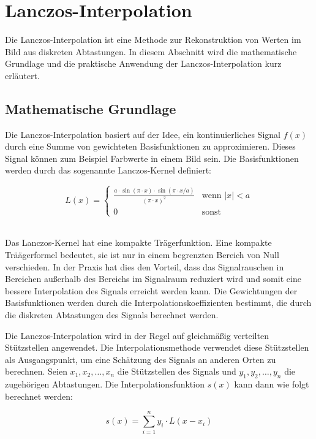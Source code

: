 \section{Lanczos-Interpolation}
    Die Lanczos-Interpolation ist eine Methode zur Rekonstruktion von Werten im Bild aus diskreten Abtastungen. 
    In diesem Abschnitt wird die mathematische Grundlage und die praktische Anwendung der Lanczos-Interpolation kurz erläutert.

\subsection{Mathematische Grundlage}

    Die Lanczos-Interpolation basiert auf der Idee, ein kontinuierliches Signal $f(x)$ durch eine Summe von gewichteten Basisfunktionen zu approximieren. 
    Dieses Signal können zum Beispiel Farbwerte in einem Bild sein.
    Die Basisfunktionen werden durch das sogenannte Lanczos-Kernel definiert:

\begin{equation}
    L(x) = \begin{cases} \frac{a \cdot \sin(\pi \cdot x) \cdot \sin(\pi \cdot x / a)}{(\pi \cdot x)^2} & \text{wenn } \left| x \right| < a \\ 0 & \text{sonst} \end{cases}
\end{equation}
~

Das Lanczos-Kernel hat eine kompakte Trägerfunktion.
Eine kompakte Träägerformel bedeutet, sie ist nur in einem begrenzten Bereich von Null verschieden. 
In der Praxis hat dies den Vorteil, dass das Signalrauschen in Bereichen außerhalb des Bereichs im Signalraum reduziert wird und somit eine bessere Interpolation des Signals erreicht werden kann.
Die Gewichtungen der Basisfunktionen werden durch die Interpolationskoeffizienten bestimmt, die durch die diskreten Abtastungen des Signals berechnet werden.

Die Lanczos-Interpolation wird in der Regel auf gleichmäßig verteilten Stützstellen angewendet. 
Die Interpolationsmethode verwendet diese Stützstellen als Ausgangspunkt, um eine Schätzung des Signals an anderen Orten zu berechnen. 
Seien $x_1, x_2, \ldots, x_n$ die Stützstellen des Signals und $y_1, y_2, \ldots, y_n$ die zugehörigen Abtastungen.
Die Interpolationsfunktion $s(x)$ kann dann wie folgt berechnet werden:

\begin{equation}
    s(x) = \sum_{i=1}^{n} y_i \cdot L(x - x_i)
\end{equation}

